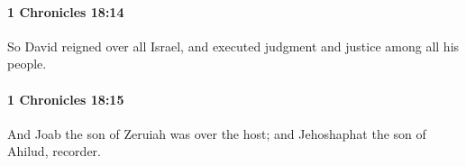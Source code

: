 		\paragraph{1 Chronicles 18:14} %
			\label{1CHRONICLES-18-14}

			So David reigned over all Israel, and executed judgment and justice among all his people.


		\paragraph{1 Chronicles 18:15} %
			\label{1CHRONICLES-18-15}

			And Joab the son of Zeruiah was over the host; and Jehoshaphat the son of Ahilud, recorder.


